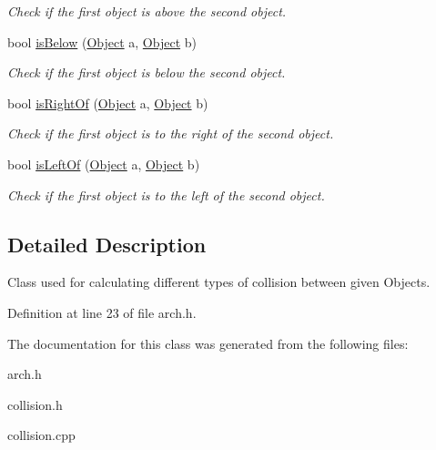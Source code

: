 \begin{DoxyCompactItemize}
\begin{DoxyCompactList}\small\item\em Check if the first object is above the second object. \end{DoxyCompactList}\item 
bool \hyperlink{classCollision_ad5414ecc098c7d63155aea827c7d68b1}{is\+Below} (\hyperlink{classObject}{Object} a, \hyperlink{classObject}{Object} b)\hypertarget{classCollision_ad5414ecc098c7d63155aea827c7d68b1}{}\label{classCollision_ad5414ecc098c7d63155aea827c7d68b1}

\begin{DoxyCompactList}\small\item\em Check if the first object is below the second object. \end{DoxyCompactList}\item 
bool \hyperlink{classCollision_a9330290516beca87905e81a974ffca83}{is\+Right\+Of} (\hyperlink{classObject}{Object} a, \hyperlink{classObject}{Object} b)\hypertarget{classCollision_a9330290516beca87905e81a974ffca83}{}\label{classCollision_a9330290516beca87905e81a974ffca83}

\begin{DoxyCompactList}\small\item\em Check if the first object is to the right of the second object. \end{DoxyCompactList}\item 
bool \hyperlink{classCollision_aea67f8b0cd9b37408e2f6f65006b27d3}{is\+Left\+Of} (\hyperlink{classObject}{Object} a, \hyperlink{classObject}{Object} b)\hypertarget{classCollision_aea67f8b0cd9b37408e2f6f65006b27d3}{}\label{classCollision_aea67f8b0cd9b37408e2f6f65006b27d3}

\begin{DoxyCompactList}\small\item\em Check if the first object is to the left of the second object. \end{DoxyCompactList}\end{DoxyCompactItemize}


\subsection{Detailed Description}
Class used for calculating different types of collision between given Objects. 

Definition at line 23 of file arch.\+h.



The documentation for this class was generated from the following files\+:\begin{DoxyCompactItemize}
\item 
arch.\+h\item 
collision.\+h\item 
collision.\+cpp\end{DoxyCompactItemize}
